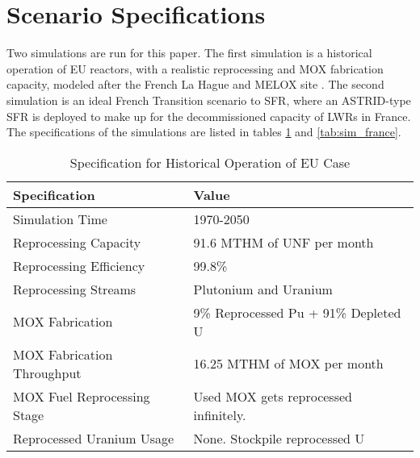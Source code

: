 \section{Scenario Specifications}

Two simulations are run for this paper.
The first simulation is a historical operation of \gls{EU} reactors, with a
realistic reprocessing and \gls{MOX} fabrication capacity, 
modeled after the French La Hague and MELOX site \cite{schneider_spent_2008, hugelmann_melox_1999}.
The second simulation is an ideal French Transition scenario to \gls{SFR},
where an ASTRID-type \gls{SFR} is deployed to make up for the decommissioned
capacity of \glspl{LWR} in France. The specifications of the simulations
are listed in tables \ref{tab:sim_eu} and \ref{tab:sim_france}.

\begin{table}[h]
	\centering
	\begin{tabularx}{\textwidth}{bb}
		\hline
		Specification & Value \\
		\hline
		Simulation Time & 1970-2050 \\ 
		Reprocessing Capacity & 91.6 MTHM of \gls{UNF} per month \cite{schneider_spent_2008} \\
		Reprocessing Efficiency & 99.8\% \\
		Reprocessing Streams & Plutonium and Uranium \\
		\gls{MOX} Fabrication & \small{9\% Reprocessed Pu + 91\% Depleted U} \\
		\gls{MOX} Fabrication Throughput & 16.25 MTHM of \gls{MOX} per month  \cite{hugelmann_melox_1999} \\
		\gls{MOX} Fuel Reprocessing Stage &  Used \gls{MOX} gets reprocessed infinitely. \\  
		Reprocessed Uranium Usage &  None. Stockpile reprocessed U \\
		\hline
	\end{tabularx}
	\caption {Specification for Historical Operation of \gls{EU} Case}
	\label{tab:sim_eu}
\end{table}

